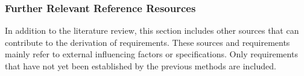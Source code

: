 
\subsubsection{Further Relevant Reference Resources}\label{subsec:furtherRequirements}

In addition to the literature review, this section includes other sources that can contribute to the derivation of requirements. These sources and requirements mainly refer to external influencing factors or specifications. Only requirements that have not yet been established by the previous methods are included.

